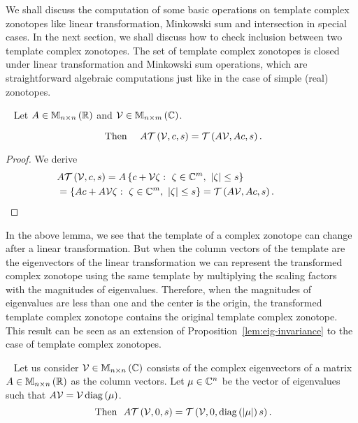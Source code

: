We shall discuss the computation of some basic operations on template
complex zonotopes like linear transformation, Minkowski sum and
intersection in special cases.  In the next section, we shall discuss
how to check inclusion between two template complex zonotopes.  The
set of template complex zonotopes is closed under linear
transformation and {Minkowski sum} operations, which are
straightforward algebraic computations just like in the case of simple
(real) zonotopes.
%
\begin{lemma}~\label{lem:lin-transform}
Let $A\in\mathbb{M}_{n\times n}\left(\mathbb{R}\right)$ and $\mathcal{V}\in\mathbb{M}_{n\times m}\left(\mathbb{C}\right)$.

%
\begin{equation*}~\label{eqn:lin-transform}
\text{Then}~~~~A\mathit{\operatorname{\mathcal{T}}}\left(\mathcal{V},c,s\right)=\mathit{\operatorname{\mathcal{T}}}\left(A\mathcal{V},Ac,s\right).
\end{equation*}
%
\end{lemma}
%
\begin{proof}
  We derive
  \begin{align*}
&
    A\mathit{\operatorname{\mathcal{T}}}\left(\mathcal{V},c,s\right)=A\left\{c+\mathcal{V}\zeta:~\zeta\in\mathbb{C}^m,~\left|\zeta\right|\leq
    s\right\}\\
    & =\left\{Ac+A\mathcal{V}\zeta:~\zeta\in\mathbb{C}^m,~\left|\zeta\right|\leq
    s\right\}=\mathit{\operatorname{\mathcal{T}}}\left(A\mathcal{V},Ac,s\right).~\hspace{3em}\qedhere
  \end{align*}
\end{proof}
%
In the above lemma, we see that the template of a complex zonotope can
change after a linear transformation.  But when the column vectors of
the template are the eigenvectors of the linear transformation we can
represent the transformed complex zonotope using the same template by
multiplying the scaling factors with the magnitudes of eigenvalues.
Therefore, when the magnitudes of eigenvalues are less than one and
the center is the origin, the transformed template complex zonotope
contains the original template complex zonotope.  This result can be
seen as an extension of Proposition~\ref{lem:eig-invariance} to the
case of template complex zonotopes.
%
\begin{lemma}~\label{lem:eig-scaling}
Let us consider $\mathcal{V}\in\mathbb{M}_{n\times n}\left(\mathbb{C}\right)$ consists of the complex
eigenvectors of a matrix $A\in\mathbb{M}_{n\times n}\left(\mathbb{R}\right)$ as the column vectors.
Let $\mu\in\mathbb{C}^n$ be the vector of eigenvalues such that
$A\mathcal{V}=\mathcal{V}\operatorname{diag}\left(\mu\right)$.
%
\begin{equation}~\label{eqn:eigen-scaling}
\text{Then}~~A\mathit{\operatorname{\mathcal{T}}}\left(\mathcal{V},0,s\right)=\mathit{\operatorname{\mathcal{T}}}\left(\mathcal{V},0,\operatorname{diag}\left(\left|\mu\right|\right)s\right).
\end{equation}
%
\end{lemma}
